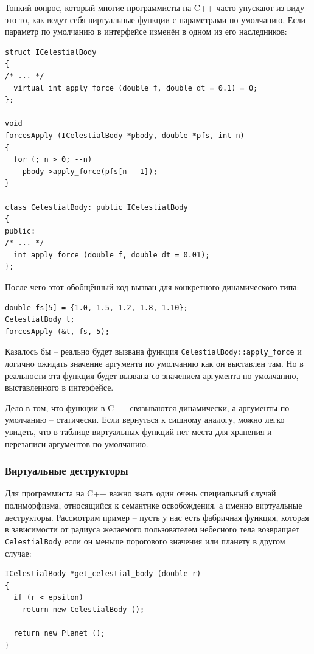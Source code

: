 \documentclass[a4paper,12pt,oneside]{article}
\begin{document}
Тонкий вопрос, который многие программисты на C++ часто упускают из виду это то, как ведут себя виртуальные функции с параметрами по умолчанию. Если параметр по умолчанию в интерфейсе изменён в одном из его наследников:

\begin{lstlisting}
struct ICelestialBody
{
/* ... */
  virtual int apply_force (double f, double dt = 0.1) = 0;
};

void 
forcesApply (ICelestialBody *pbody, double *pfs, int n)
{
  for (; n > 0; --n)
    pbody->apply_force(pfs[n - 1]);
}

class CelestialBody: public ICelestialBody
{
public:
/* ... */
  int apply_force (double f, double dt = 0.01);
};
\end{lstlisting}

После чего этот обобщённый код вызван для конкретного динамического типа:

\begin{lstlisting}
double fs[5] = {1.0, 1.5, 1.2, 1.8, 1.10};
CelestialBody t;
forcesApply (&t, fs, 5);
\end{lstlisting}

Казалось бы -- реально будет вызвана функция \lstinline!CelestialBody::apply_force! и логично ожидать значение аргумента по умолчанию как он выставлен там. Но в реальности эта функция будет вызвана со значением аргумента по умолчанию, выставленного в интерфейсе.

Дело в том, что функции в C++ связываются динамически, а аргументы по умолчанию – статически. Если вернуться к сишному аналогу, можно легко увидеть, что в таблице виртуальных функций нет места для хранения и перезаписи аргументов по умолчанию.

\subsubsection{Виртуальные деструкторы}\label{VirtDestr}

Для программиста на C++ важно знать один очень специальный случай полиморфизма, относящийся к семантике освобождения, а именно виртуальные деструкторы. Рассмотрим пример – пусть у нас есть фабричная функция, которая в зависимости от радиуса желаемого пользователем небесного тела возвращает \lstinline!CelestialBody! если он меньше порогового значения или планету в другом случае:

\begin{lstlisting}
ICelestialBody *get_celestial_body (double r)
{
  if (r < epsilon)
    return new CelestialBody ();

  return new Planet ();
}
\end{lstlisting}
\end{document}
